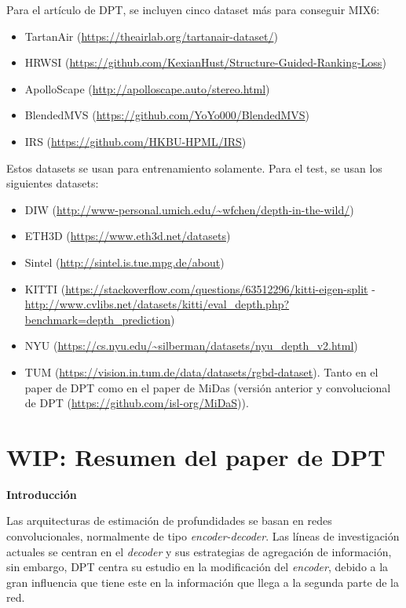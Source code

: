 \documentclass[a4paper, 11pt]{article}
\begin{document}
Para el artículo de DPT, se incluyen cinco dataset más para conseguir MIX6:
\begin{itemize}
\item TartanAir (\url{https://theairlab.org/tartanair-dataset/})
\item HRWSI (\url{https://github.com/KexianHust/Structure-Guided-Ranking-Loss})
\item ApolloScape (\url{http://apolloscape.auto/stereo.html})
\item BlendedMVS (\url{https://github.com/YoYo000/BlendedMVS})
\item IRS (\url{https://github.com/HKBU-HPML/IRS})
\end{itemize}

Estos datasets se usan para entrenamiento solamente. Para el test, se usan los siguientes datasets: 

\begin{itemize}
\item DIW (\url{http://www-personal.umich.edu/~wfchen/depth-in-the-wild/})
\item ETH3D (\url{https://www.eth3d.net/datasets})
\item Sintel (\url{http://sintel.is.tue.mpg.de/about})
\item KITTI (\url{https://stackoverflow.com/questions/63512296/kitti-eigen-split} - \url{http://www.cvlibs.net/datasets/kitti/eval_depth.php?benchmark=depth_prediction})
\item NYU (\url{https://cs.nyu.edu/~silberman/datasets/nyu_depth_v2.html})
\item TUM (\url{https://vision.in.tum.de/data/datasets/rgbd-dataset}). 
Tanto en el paper de DPT como en el paper de MiDas (versión anterior y convolucional de DPT (\url{https://github.com/isl-org/MiDaS})).
\end{itemize}





\section{WIP: Resumen del paper de DPT}

\textbf{Introducción}

Las arquitecturas de estimación de profundidades se basan en redes convolucionales, normalmente de tipo \textit{encoder-decoder}. Las líneas de investigación actuales se centran en el \textit{decoder} y sus estrategias de agregación de información, sin embargo, DPT centra su estudio en la modificación del \textit{encoder}, debido a la gran influencia que tiene este en la información que llega a la segunda parte de la red.
\end{document}
